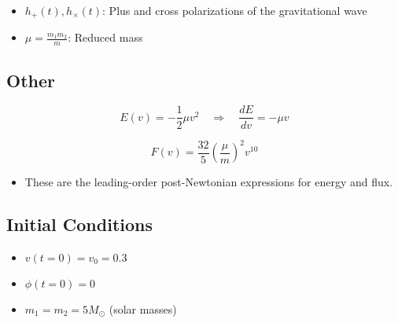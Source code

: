 \documentclass {article}
\begin{document}
\begin {itemize}
  \item \( h_+(t), h_{\times}(t) \): Plus and cross polarizations of the gravitational wave
  \item \( \mu = \frac{m_1 m_2}{m} \): Reduced mass
\end{itemize}

\subsection*{Other}

\begin {equation}
E(v) = -\frac{1}{2} \mu v^2 \quad \Rightarrow \quad \frac{dE}{dv} = -\mu v
\end {equation}

\begin {equation}
F(v) = \frac{32}{5} \left( \frac{\mu}{m} \right)^2 v^{10}
\end {equation}

\begin{itemize}
  \item These are the leading-order post-Newtonian expressions for energy and flux.
\end{itemize}

\subsection *{Initial Conditions}

\begin{itemize}
  \item \( v(t=0) = v_0 = 0.3 \)
  \item \( \phi(t=0) = 0 \)
  \item \( m_1 = m_2 = 5 M_{\odot} \) (solar masses)
\end{itemize}
\end{document}
